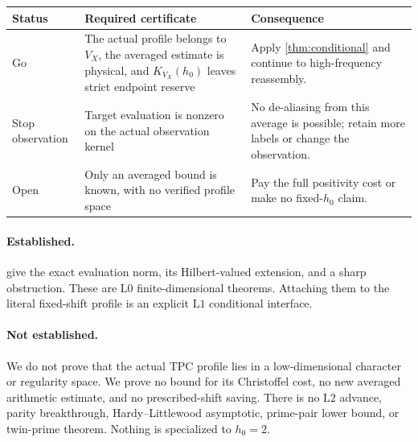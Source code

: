 \documentclass[11pt]{article}
\theoremstyle{definition}
\theoremstyle{remark}
\newcommand{\Lzero}{\mathrm{L0}}
\newcommand{\Lone}{\mathrm{L1}}
\newcommand{\Ltwo}{\mathrm{L2}}
\begin{document}
\begin{center}
\small
\begin{tabularx}{\textwidth}{@{}p{}p{}X@{}}
\toprule
Status & Required certificate & Consequence\\
\midrule
Go &
The actual profile belongs to \(V_X\), the averaged estimate is
physical, and \(K_{V_X}(h_0)\) leaves strict endpoint reserve &
Apply \cref{thm:conditional} and continue to high-frequency
reassembly.\\
Stop observation &
Target evaluation is nonzero on the actual observation kernel &
No de-aliasing from this average is possible; retain more labels or
change the observation.\\
Open &
Only an averaged bound is known, with no verified profile space &
Pay the full positivity cost or make no fixed-\(h_0\) claim.\\
\bottomrule
\end{tabularx}
\end{center}

\paragraph{Established.}
give the exact evaluation norm, its
Hilbert-valued extension, and a sharp obstruction.  These are
\(\Lzero\) finite-dimensional theorems.  Attaching them to the
literal fixed-shift profile is an explicit \(\Lone\) conditional
interface.

\paragraph{Not established.}
We do not prove that the actual TPC profile lies in a low-dimensional
character or regularity space.  We prove no bound for its
Christoffel cost, no new averaged arithmetic estimate, and no
prescribed-shift saving.  There is no \(\Ltwo\) advance, parity
breakthrough, Hardy--Littlewood asymptotic, prime-pair lower bound, or
twin-prime theorem.  Nothing is specialized to \(h_0=2\).

\begingroup
\small
\setlength{\bibsep}{2pt plus 0.3ex}
\sloppy


\endgroup
\end{document}
